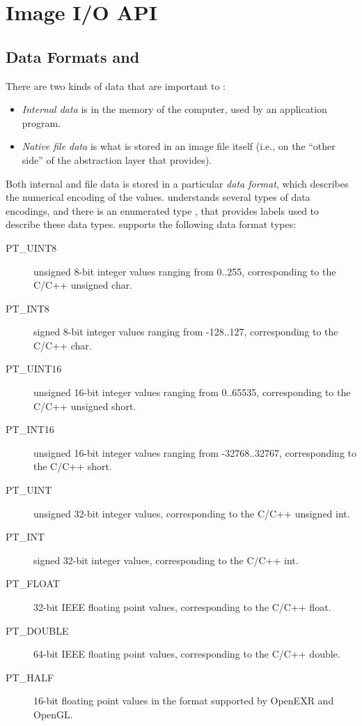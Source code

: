 \chapter{Image I/O API}
\label{chap:imageioapi}



\section{Data Formats and \ParamBaseType}
\label{sec:dataformats}
\label{sec:ParamBaseType}

There are two kinds of data that are important to \product:

\begin{itemize}
\item \emph{Internal data} is in the memory of the computer, used by an
  application program.
\item \emph{Native file data} is what is stored in an image file itself
  (i.e., on the ``other side'' of the abstraction layer that \product
  provides).
\end{itemize}

Both internal and file data is stored in a particular \emph{data
  format}, which describes the numerical encoding of the values.
\product understands several types of data encodings, and there
is an enumerated type \ParamBaseType, that provides labels used
to describe these data types.  \product supports the following 
data format types:

\begin{description}
\item[\halfspc\rm {\cf PT_UINT8}] unsigned 8-bit integer values ranging from
  0..255, corresponding to the C/C++ {\kw unsigned char}.
\item[\halfspc\rm {\cf PT_INT8}] signed 8-bit integer values ranging from
  -128..127, corresponding to the C/C++ {\kw char}.
\item[\halfspc\rm {\cf PT_UINT16}] unsigned 16-bit integer values ranging
  from 0..65535, corresponding to the C/C++ {\kw unsigned short}.
\item[\halfspc\rm {\cf PT_INT16}] unsigned 16-bit integer values ranging
  from -32768..32767, corresponding to the C/C++ {\kw short}.
\item[\halfspc\rm {\cf PT_UINT}] unsigned 32-bit integer values,
  corresponding to the C/C++ {\kw unsigned int}.
\item[\halfspc\rm {\cf PT_INT}] signed 32-bit integer values, corresponding
  to the C/C++ {\kw int}.
\item[\halfspc\rm {\cf PT_FLOAT}] 32-bit IEEE floating point values,
  corresponding to the C/C++ {\kw float}.
\item[\halfspc\rm {\cf PT_DOUBLE}] 64-bit IEEE floating point values,
  corresponding to the C/C++ {\kw double}.
\item[\halfspc\rm {\cf PT_HALF}] 16-bit floating point values in the format
  supported by OpenEXR and OpenGL.
\end{description}

